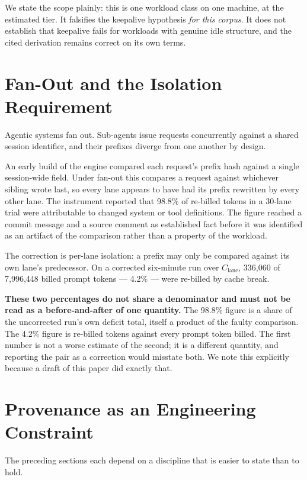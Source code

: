 \documentclass[11pt,twocolumn,letterpaper]{article}
\begin{document}
We state the scope plainly: this is one workload class on one machine, at the
estimated tier. It falsifies the keepalive hypothesis \emph{for this corpus}. It
does not establish that keepalive fails for workloads with genuine idle
structure, and the cited derivation remains correct on its own terms.

\section{Fan-Out and the Isolation Requirement}

Agentic systems fan out. Sub-agents issue requests concurrently against a shared
session identifier, and their prefixes diverge from one another by design.

An early build of the engine compared each request's prefix hash against a
single session-wide field. Under fan-out this compares a request against
whichever sibling wrote last, so every lane appears to have had its prefix
rewritten by every other lane. The instrument reported that 98.8\% of re-billed
tokens in a 30-lane trial were attributable to changed system or tool
definitions. The figure reached a commit message and a source comment as
established fact before it was identified as an artifact of the comparison
rather than a property of the workload.

The correction is per-lane isolation: a prefix may only be compared against its
own lane's predecessor. On a corrected six-minute run over $C_{\text{lane}}$,
336{,}060 of 7{,}996{,}448 billed prompt tokens --- 4.2\% --- were re-billed by
cache break.

\textbf{These two percentages do not share a denominator and must not be read
as a before-and-after of one quantity.} The 98.8\% figure is a share of the
uncorrected run's own deficit total, itself a product of the faulty comparison.
The 4.2\% figure is re-billed tokens against every prompt token billed. The
first number is not a worse estimate of the second; it is a different quantity,
and reporting the pair as a correction would misstate both. We note this
explicitly because a draft of this paper did exactly that.

\section{Provenance as an Engineering Constraint}

The preceding sections each depend on a discipline that is easier to state than
to hold.
\end{document}
